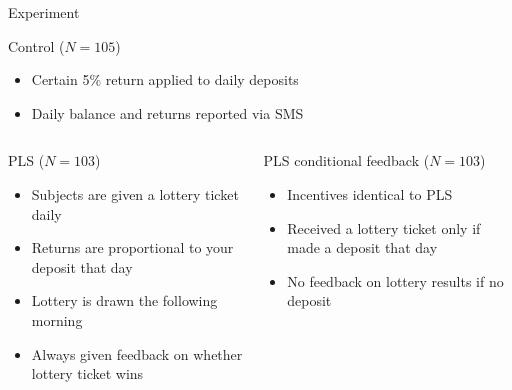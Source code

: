\documentclass[aspectratio=169]{beamer}
\begin{document}
\begin{frame}{Experiment}

	\begin{block}{Control ($N = 105$)}
		\begin{itemize}
		\item Certain 5\% return applied to daily deposits
		\item Daily balance and returns reported via SMS
		\end{itemize}
	\end{block}


	\begin{columns}[T]

		\begin{column}{0.48\textwidth}
			\begin{block}{PLS ($N = 103$)}
			\begin{itemize}
			\item Subjects are given a lottery ticket daily
			\item Returns are proportional to your deposit that day
			\item Lottery is drawn the following morning
			\item Always given feedback on whether lottery ticket wins
			\end{itemize}
			\end{block}
		\end{column}

		\begin{column}{0.48\textwidth}
			\begin{block}{PLS conditional feedback ($N = 103$)}
			\begin{itemize}
			\item Incentives identical to PLS
			\item Received a lottery ticket only if made a deposit that day
			\item No feedback on lottery results if no deposit
			\end{itemize}
			\end{block}
		\end{column}

	\end{columns}

\end{frame}
\end{document}
